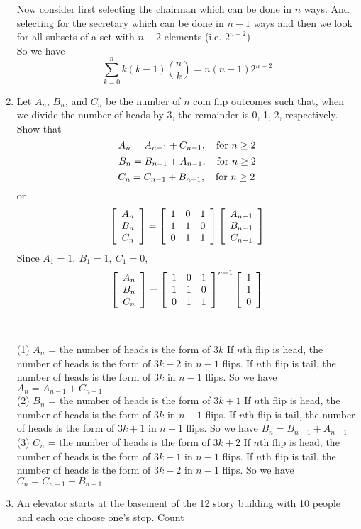 \documentclass[12pt]{article}%
\newcommand{\0}{{\bf 0}}
\begin{document}
\begin{enumerate}
Now consider first selecting the chairman which can be done in $n$ ways. And selecting for the secretary which can be done in $n-1$ ways
and then we look for all subsets of a set with $n - 2$ elements (i.e. $2^{n-2}$)
\\So we have 
$$\sum_{k=0}^n k(k-1)  {n \choose k} = n(n-1)2^{n-2}$$
\item  
Let $A_n$, $B_n$, and $C_n$ be the number of $n$ coin flip outcomes 
such that, when we divide the number of heads by 3,
the remainder is 0, 1, 2, respectively.  
Show that
$$A_n=A_{n-1}+C_{n-1},\quad \mb{for $n\ge 2$}$$
$$B_n=B_{n-1}+A_{n-1},\quad \mb{for $n\ge 2$}$$
$$C_n=C_{n-1}+B_{n-1},\quad \mb{for $n\ge 2$}$$
or
$$
\left[\ba{c}A_n\\B_n\\C_n\ea\right]
=
\left[\ba{ccc}1&0&1\\1&1&0\\0&1&1\ea\right]
\left[\ba{c}A_{n-1}\\B_{n-1}\\C_{n-1}\ea\right]
$$
Since $A_1=1,\ B_1=1,\ C_1=0$,
$$
\left[\ba{c}A_n\\B_n\\C_n\ea\right]
=
\left[\ba{ccc}1&0&1\\1&1&0\\0&1&1\ea\right]^{n-1}
\left[\ba{c}1\\1\\0\ea\right]
$$
\\
{\color{blue}{\bf Sol.}}
\\
(1) $A_n$ = the number of heads is the form of $3k$  
If $n$th flip is head, the number of heads is the form of $3k+2$ in $n-1$ flips.
If $n$th flip is tail, the number of heads is the form of $3k$ in $n-1$ flips.
So we have $A_n=A_{n-1}+C_{n-1}$
\\
(2) $B_n$ = the number of heads is the form of $3k+1$ 
If $n$th flip is head, the number of heads is the form of $3k$ in $n-1$ flips.
If $n$th flip is tail, the number of heads is the form of $3k+1$ in $n-1$ flips.
So we have $B_n=B_{n-1}+A_{n-1}$
\\
(3) $C_n$ = the number of heads is the form of $3k+2$ 
If $n$th flip is head, the number of heads is the form of $3k+1$ in $n-1$ flips.
If $n$th flip is tail, the number of heads is the form of $3k+2$ in $n-1$ flips.
So we have $C_n=C_{n-1}+B_{n-1}$
\item
An elevator starts at the basement of the 12 story building with 10 people
and each one choose one's stop. 
Count
\begin{enumerate}

\end{enumerate}
\end{enumerate}
\end{document}
